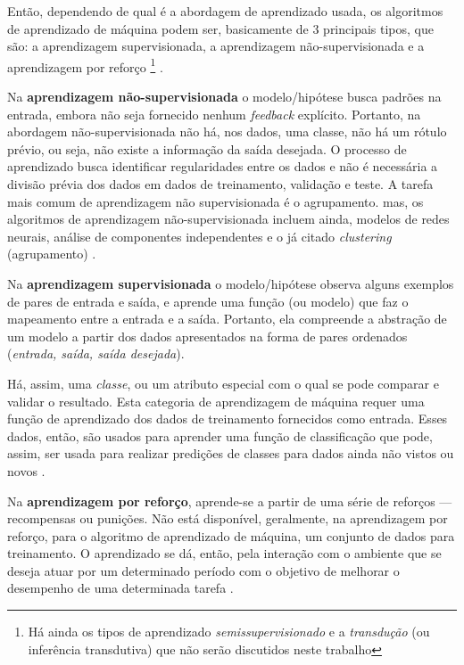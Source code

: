 Então, dependendo de qual é a abordagem de aprendizado usada, os algoritmos de aprendizado de máquina podem ser, basicamente de 3 principais tipos, que são: a aprendizagem supervisionada, a aprendizagem não-supervisionada e a aprendizagem por reforço \footnote{Há ainda os tipos de aprendizado \textit{semissupervisionado} e a \textit{transdução} (ou inferência transdutiva) que não serão discutidos neste trabalho} \cite{Norvig2013, baeza-yates_recuperacao_2013}. 

Na \textbf{aprendizagem não-supervisionada} o modelo/hipótese busca padrões na entrada, embora não seja fornecido nenhum \textit{feedback} explícito. Portanto, na abordagem não-supervisionada não há, nos dados, uma classe, não há um rótulo prévio, ou seja, não existe a informação da saída desejada. O processo de aprendizado busca identificar regularidades entre os dados e não é necessária a divisão prévia dos dados em dados de treinamento, validação e teste.  A tarefa mais comum de aprendizagem não supervisionada é o agrupamento. mas, os algoritmos de aprendizagem não-supervisionada incluem ainda, modelos de redes neurais, análise de componentes independentes e o já citado \textit{clustering} (agrupamento) \cite{Norvig2013, Boscarioli2017, goldschmidt2005, aprenda_mineracao_fernando_amaral16}.

Na \textbf{aprendizagem supervisionada} o modelo/hipótese observa alguns exemplos de pares de entrada e saída, e aprende uma função (ou modelo) que faz o mapeamento entre a entrada e a saída. Portanto, ela compreende a abstração de um modelo a partir dos dados apresentados na forma de pares ordenados (\textit{entrada, saída, saída desejada}). 

Há, assim, uma \textit{classe}, ou um atributo especial com o qual se pode comparar e validar o resultado. Esta categoria de aprendizagem de máquina requer uma função de aprendizado dos dados de treinamento fornecidos como entrada. Esses dados, então, são usados para aprender uma função de classificação que pode, assim, ser usada para realizar predições de classes para dados ainda não vistos ou novos \cite{Norvig2013} \cite{luger_inteligencia_2015, baeza-yates_recuperacao_2013}.

Na \textbf{aprendizagem por reforço}, aprende-se a partir de uma série de reforços --- recompensas ou punições. Não está disponível, geralmente, na aprendizagem por reforço, para o algoritmo de aprendizado de máquina, um conjunto de dados para treinamento. O aprendizado se dá, então, pela interação com o ambiente que se deseja atuar por um determinado período com o objetivo de melhorar o desempenho de uma determinada tarefa \cite{Norvig2013, aprenda_mineracao_fernando_amaral16, silva_restaurante_2019}.

